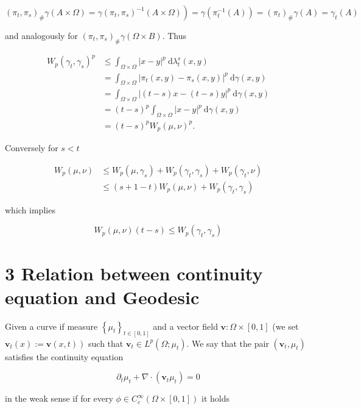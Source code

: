 \documentclass[10pt]{article}
\begin{document}
\[
\left.\left(\pi_{t}, \pi_{s}\right)_{\#} \gamma(A \times \Omega)=\gamma\left(\pi_{t}, \pi_{s}\right)^{-1}(A \times \Omega)\right)=\gamma\left(\pi_{t}^{-1}(A)\right)=\left(\pi_{t}\right)_{\#} \gamma(A)=\gamma_{t}(A)
\]

and analogously for \(\left(\pi_{t}, \pi_{s}\right)_{\#} \gamma(\Omega \times B)\). Thus

\[
\begin{aligned}
W_{p}\left(\gamma_{t}, \gamma_{s}\right)^{p} & \leq \int_{\Omega \times \Omega}|x-y|^{p} \mathrm{~d} \lambda_{t}^{s}(x, y) \\
& =\int_{\Omega \times \Omega}\left|\pi_{t}(x, y)-\pi_{s}(x, y)\right|^{p} \mathrm{~d} \gamma(x, y) \\
& =\int_{\Omega \times \Omega}|(t-s) x-(t-s) y|^{p} \mathrm{~d} \gamma(x, y) \\
& =(t-s)^{p} \int_{\Omega \times \Omega}|x-y|^{p} \mathrm{~d} \gamma(x, y) \\
& =(t-s)^{p} W_{p}(\mu, \nu)^{p} .
\end{aligned}
\]

Conversely for \(s<t\)

\[
\begin{aligned}
W_{p}(\mu, \nu) & \leq W_{p}\left(\mu, \gamma_{s}\right)+W_{p}\left(\gamma_{t}, \gamma_{s}\right)+W_{p}\left(\gamma_{t}, \nu\right) \\
& \leq(s+1-t) W_{p}(\mu, \nu)+W_{p}\left(\gamma_{t}, \gamma_{s}\right)
\end{aligned}
\]

which implies

\[
W_{p}(\mu, \nu)(t-s) \leq W_{p}\left(\gamma_{t}, \gamma_{s}\right)
\]

\section*{3 Relation between continuity equation and Geodesic}
Given a curve if measure \(\left\{\mu_{t}\right\}_{t \in[0,1]}\) and a vector field \(\mathbf{v}: \Omega \times[0,1]\) (we set \(\left.\mathbf{v}_{t}(x):=\mathbf{v}(x, t)\right)\) such that \(\mathbf{v}_{t} \in L^{p}\left(\Omega ; \mu_{t}\right)\). We say that the pair \(\left(\mathbf{v}_{t}, \mu_{t}\right)\) satisfies the continuity equation

\[
\partial_{t} \mu_{t}+\nabla \cdot\left(\mathbf{v}_{t} \mu_{t}\right)=0
\]

in the weak sense if for every \(\phi \in C_{c}^{\infty}(\Omega \times[0,1])\) it holds
\end{document}
